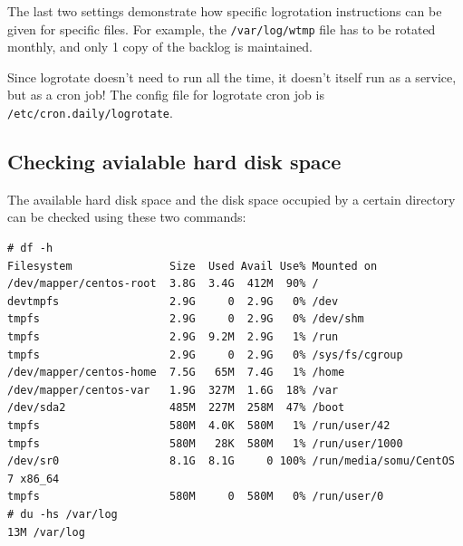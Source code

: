The last two settings demonstrate how specific logrotation instructions can be given for specific files. For example, the \verb|/var/log/wtmp| file has to be rotated monthly, and only 1 copy of the backlog is maintained. 

Since logrotate doesn't need to run all the time, it doesn't itself run as a service, but as a cron job! The config file for  logrotate cron job is \verb|/etc/cron.daily/logrotate|.

\subsection{Checking avialable hard disk space}
The available hard disk space and the disk space occupied by a certain directory can be checked using these two commands:

\vspace{-15pt}
\begin{verbatim}
# df -h
Filesystem               Size  Used Avail Use% Mounted on
/dev/mapper/centos-root  3.8G  3.4G  412M  90% /
devtmpfs                 2.9G     0  2.9G   0% /dev
tmpfs                    2.9G     0  2.9G   0% /dev/shm
tmpfs                    2.9G  9.2M  2.9G   1% /run
tmpfs                    2.9G     0  2.9G   0% /sys/fs/cgroup
/dev/mapper/centos-home  7.5G   65M  7.4G   1% /home
/dev/mapper/centos-var   1.9G  327M  1.6G  18% /var
/dev/sda2                485M  227M  258M  47% /boot
tmpfs                    580M  4.0K  580M   1% /run/user/42
tmpfs                    580M   28K  580M   1% /run/user/1000
/dev/sr0                 8.1G  8.1G     0 100% /run/media/somu/CentOS 7 x86_64
tmpfs                    580M     0  580M   0% /run/user/0
# du -hs /var/log
13M	/var/log
\end{verbatim}
\vspace{-10pt}

